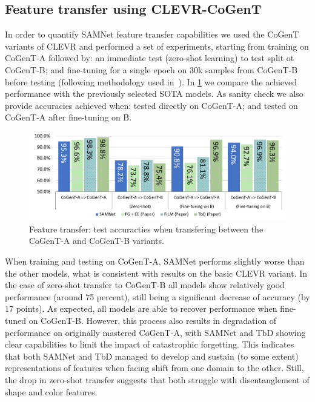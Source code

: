 \subsection{Feature transfer using CLEVR-CoGenT}
\label{sec:feature}

In order to quantify SAMNet feature transfer capabilities we used the CoGenT variants of CLEVR and performed a set of experiments, starting from training on CoGenT-A followed by:
an immediate test (zero-shot learning) to test split ot CoGenT-B; and fine-tuning for a single epoch on 30k samples from CoGenT-B before testing (following methodology used in~\cite{johnson2017inferring, mascharka2018transparency, perez2018film, marois2018transfer}).
In \cref{fig:CoGenT-B-results} we compare the achieved performance with the previously selected SOTA models.
As sanity check we also provide accuracies achieved when: tested directly on CoGenT-A; and tested on CoGenT-A after fine-tuning on B.

\begin{figure}[htbp]
	\centering
	\includegraphics[width=\columnwidth]{../img/plots/cogent_feature_transfer_baselines.pdf}
	\caption{Feature transfer: test accuracties when transfering between the CoGenT-A and CoGenT-B variants.}
	\label{fig:CoGenT-B-results}
\end{figure}

When training and testing on CoGenT-A, SAMNet performs slightly worse than the other models, what is consistent with results on the basic CLEVR variant.
In the case of zero-shot transfer to CoGenT-B all models show relatively good performance (around 75 percent), still being a significant decrease of accuracy (by 17 points).
As expected, all models are able to recover performance when fine-tuned on CoGenT-B.
However, this process also results in degradation of performance on originally mastered CoGenT-A, with SAMNet and TbD showing clear capabilities to limit the impact of catastrophic forgetting.
This indicates that both SAMNet and TbD managed to develop and sustain (to some extent) representations of features when facing shift from one domain to the other.
Still, the drop in zero-shot transfer suggests that both struggle with disentanglement of shape and color features.

